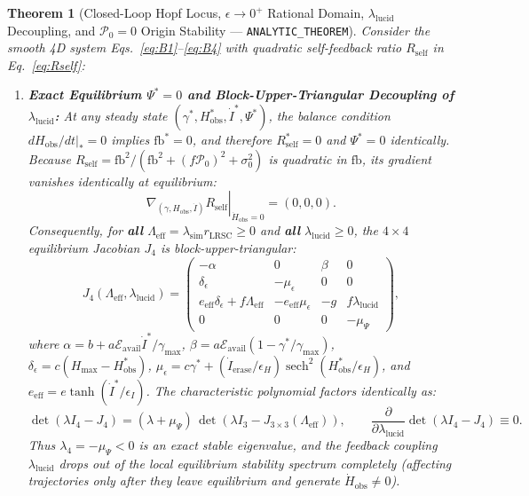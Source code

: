 \documentclass[11pt,a4paper]{article}
\newtheorem{theorem}{Theorem}
\theoremstyle{definition}
\begin{document}
\begin{theorem}[Closed-Loop Hopf Locus, $\epsilon \to 0^+$ Rational Domain, $\lambda_{\mathrm{lucid}}$ Decoupling, and $\mathcal{P}_0 = 0$ Origin Stability --- \texttt{ANALYTIC\_THEOREM}]
\label{thm:dream_bifurcation}
Consider the smooth 4D system Eqs.~\eqref{eq:B1}--\eqref{eq:B4} with quadratic self-feedback ratio $R_{\mathrm{self}}$ in Eq.~\eqref{eq:Rself}:
\begin{enumerate}
  \item \textbf{Exact Equilibrium $\Psi^* = 0$ and Block-Upper-Triangular Decoupling of $\lambda_{\mathrm{lucid}}$:} At any steady state $(\gamma^*, H_{\mathrm{obs}}^*, \dot{I}^*, \Psi^*)$, the balance condition $\left.dH_{\mathrm{obs}}/dt\right|_* = 0$ implies $\mathrm{fb}^* = 0$, and therefore $R_{\mathrm{self}}^* = 0$ and $\Psi^* = 0$ identically. Because $R_{\mathrm{self}} = \mathrm{fb}^2 / (\mathrm{fb}^2 + (f\mathcal{P}_0)^2 + \sigma_0^2)$ is quadratic in $\mathrm{fb}$, its gradient vanishes identically at equilibrium:
  \begin{equation}
  \left.\nabla_{(\gamma, H_{\mathrm{obs}}, \dot{I})} R_{\mathrm{self}}\right|_{\dot{H}_{\mathrm{obs}}=0} = (0, 0, 0).
  \end{equation}
  Consequently, for \textbf{all} $\Lambda_{\mathrm{eff}} = \lambda_{\mathrm{sim}}r_{\mathrm{LRSC}} \ge 0$ and \textbf{all} $\lambda_{\mathrm{lucid}} \ge 0$, the $4 \times 4$ equilibrium Jacobian $J_4$ is block-upper-triangular:
  \begin{equation}
  \label{eq:J4_block}
  J_4(\Lambda_{\mathrm{eff}}, \lambda_{\mathrm{lucid}}) =
  \begin{pmatrix}
    -\alpha & 0 & \beta & 0 \\
    \delta_{\epsilon} & -\mu_{\epsilon} & 0 & 0 \\
    e_{\mathrm{eff}}\delta_{\epsilon} + f\Lambda_{\mathrm{eff}} & -e_{\mathrm{eff}}\mu_{\epsilon} & -g & f\lambda_{\mathrm{lucid}} \\
    0 & 0 & 0 & -\mu_\Psi
  \end{pmatrix},
  \end{equation}
  where $\alpha = b + a\mathcal{E}_{\mathrm{avail}}\dot{I}^*/\gamma_{\max}$, $\beta = a\mathcal{E}_{\mathrm{avail}}(1 - \gamma^*/\gamma_{\max})$, $\delta_{\epsilon} = c(H_{\max} - H_{\mathrm{obs}}^*)$, $\mu_{\epsilon} = c\gamma^* + (\dot{I}_{\mathrm{erase}}/\epsilon_H)\operatorname{sech}^2(H_{\mathrm{obs}}^*/\epsilon_H)$, and $e_{\mathrm{eff}} = e\tanh(\dot{I}^*/\epsilon_I)$. The characteristic polynomial factors identically as:
  \begin{equation}
  \label{eq:charpoly_factor}
  \det(\lambda I_4 - J_4) = (\lambda + \mu_\Psi)\,\det\!\left(\lambda I_3 - J_{3\times 3}(\Lambda_{\mathrm{eff}})\right), \qquad \frac{\partial}{\partial \lambda_{\mathrm{lucid}}}\det(\lambda I_4 - J_4) \equiv 0.
  \end{equation}
  Thus $\lambda_4 = -\mu_\Psi < 0$ is an exact stable eigenvalue, and the feedback coupling $\lambda_{\mathrm{lucid}}$ drops out of the local equilibrium stability spectrum completely (affecting trajectories only after they leave equilibrium and generate $\dot{H}_{\mathrm{obs}} \neq 0$).


\end{enumerate}
\end{theorem}
\end{document}
